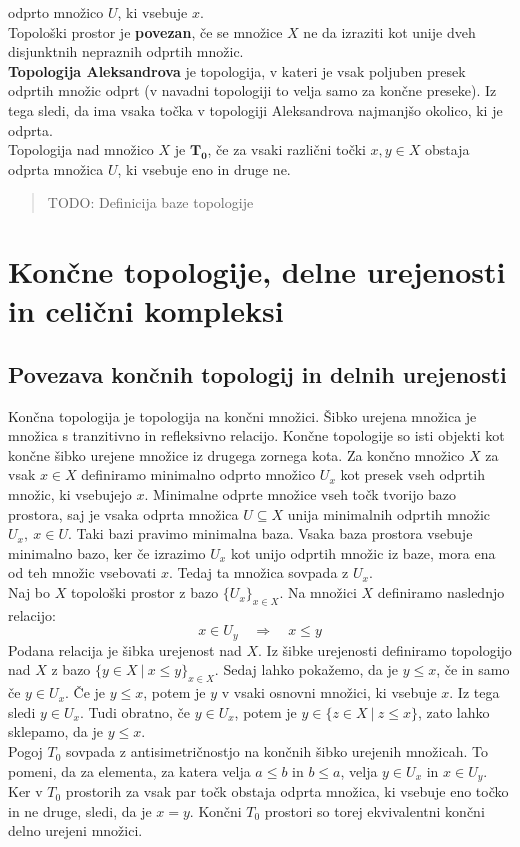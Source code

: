 \documentclass[a4paper, 12pt]{book}
\theoremstyle{definition}
\begin{document}
odprto množico $U$, ki vsebuje $x$.\\
Topološki prostor je \textbf{povezan}, če se množice $X$ ne da izraziti kot unije
dveh disjunktnih nepraznih odprtih množic.\\
\textbf{Topologija Aleksandrova} je topologija, v kateri je vsak poljuben presek odprtih
množic odprt (v navadni topologiji to velja samo za končne preseke). Iz tega sledi,
da ima vsaka točka v topologiji Aleksandrova najmanjšo okolico, ki je odprta.\\
Topologija nad množico $X$ je $\mathbf{T_0}$, če za vsaki različni točki $x,y \in X$
obstaja odprta množica $U$, ki vsebuje eno in druge ne.
\begin{quote}
  TODO: Definicija baze topologije
\end{quote}

\chapter{Končne topologije, delne urejenosti in celični kompleksi}
\section{Povezava končnih topologij in delnih urejenosti}
Končna topologija je topologija na končni množici. Šibko urejena množica je
množica s tranzitivno in refleksivno relacijo. Končne topologije so isti objekti
kot končne šibko urejene množice iz drugega zornega kota. Za končno množico $X$ 
za vsak $x\in X$ definiramo minimalno odprto množico $U_x$ kot presek vseh odprtih
množic, ki vsebujejo $x$. Minimalne odprte množice vseh točk tvorijo bazo prostora,
saj je vsaka odprta množica $U \subseteq X$ unija minimalnih odprtih množic $U_x,\ x\in U$.
Taki bazi pravimo minimalna baza. Vsaka baza prostora vsebuje minimalno bazo,
ker če izrazimo $U_x$ kot unijo odprtih množic iz baze, mora ena od teh množic
vsebovati $x$. Tedaj ta množica sovpada z $U_x$.\\
Naj bo $X$ topološki prostor z bazo $\{U_x\}_{x \in X}$. Na množici $X$ definiramo
naslednjo relacijo:
\[x \in U_y\quad \Rightarrow\quad x \leq y\]
Podana relacija je šibka urejenost nad $X$. Iz šibke urejenosti
definiramo topologijo nad $X$ z bazo $\{y \in X\ |\ x \leq y\}_{x \in X}$.
Sedaj lahko pokažemo, da je $y \leq x$, če in samo če $y \in U_x$.
Če je $y \leq x$, potem je $y$ v vsaki osnovni množici, ki vsebuje $x$. Iz tega sledi $y \in U_x$.
Tudi obratno, če $y \in U_x$, potem je $y \in \{z \in X\ |\ z \leq x\}$, zato lahko sklepamo, da je $y \leq x$.\\
Pogoj $T_0$ sovpada z antisimetričnostjo na končnih šibko urejenih množicah.
To pomeni, da za elementa, za katera velja $a \leq b$ in $b \leq a$, velja $y \in U_x$ in $x \in U_y$.
Ker v $T_0$ prostorih za vsak par točk obstaja odprta množica,
ki vsebuje eno točko in ne druge, sledi, da je $x = y$. Končni $T_0$ prostori so
torej ekvivalentni končni delno urejeni množici.\\
\end{document}
